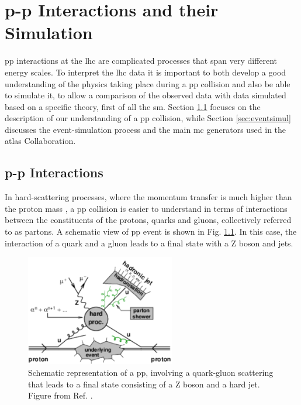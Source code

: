 \chapter{p-p Interactions and their Simulation}
\label{chap:event:MC}


\gls{pp} interactions at the \gls{lhc} are complicated processes that span very different energy scales. 
To interpret the \gls{lhc} data it is important to both 
develop a good understanding of the physics taking place during a \gls{pp} collision and also be able to simulate 
it, to allow a comparison of the observed data with data simulated based on a specific theory, first of all the \gls{sm}.
Section \ref{sec:ppint} focuses on the description of our understanding of a \gls{pp} collision, while Section \ref{sec:eventsimul} 
discusses the event-simulation process and the main \gls{mc} generators used in the \gls{atlas} Collaboration. 



\section{p-p Interactions}
\label{sec:ppint}

In hard-scattering processes, where the momentum transfer is much higher than the proton mass \cite{Butterworth:2012fj}, 
a \gls{pp} collision is easier to understand in terms of interactions between the constituents of the protons, quarks and gluons, 
collectively referred to as partons. A schematic view of \gls{pp} event is shown in Fig. \ref{fig:sim:pp2}. In this case, the interaction of a quark and a gluon leads to a final state with a Z boson and jets. 


\begin{figure}[h]
\begin{center}
    \includegraphics[width=0.58\textwidth]{figures/simul/ppcoll2}
\end{center}
 \caption{Schematic representation of a \gls{pp}, involving a quark-gluon scattering that leads to a final state consisting of a Z boson and a hard jet. Figure from Ref. \cite{Butterworth:2012fj}.}
  \label{fig:sim:pp2}
\end{figure}


